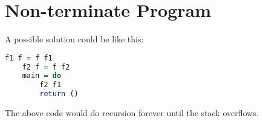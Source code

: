 \documentclass[paper=a4, fontsize=11pt]{scrartcl} %
\numberwithin{equation}{section} %
\numberwithin{figure}{section} %
\numberwithin{table}{section} %
\begin{document}
\section{Non-terminate Program}
A possible solution could be like this:
\begin{lstlisting}[language=haskell]
	f1 f = f f1
	f2 f = f f2
	main = do
		f2 f1
		return ()
\end{lstlisting}

The above code would do recursion forever until the stack overflows.
\end{document}

